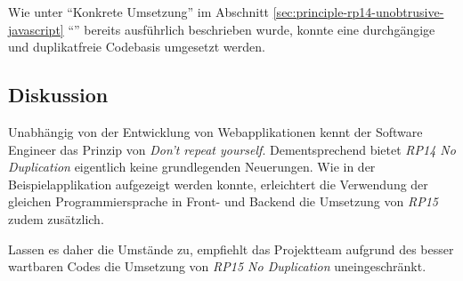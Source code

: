 Wie unter ``Konkrete Umsetzung'' im Abschnitt \ref{sec:principle-rp14-unobtrusive-javascript} ``'' bereits ausführlich beschrieben wurde, konnte eine durchgängige und duplikatfreie Codebasis umgesetzt werden.


\subsection*{Diskussion}

Unabhängig von der Entwicklung von Webapplikationen kennt der Software Engineer das Prinzip von \emph{Don't repeat yourself}. Dementsprechend bietet \emph{RP14 No Duplication} eigentlich keine grundlegenden Neuerungen. Wie in der Beispielapplikation aufgezeigt werden konnte, erleichtert die Verwendung der gleichen Programmiersprache in Front- und Backend die Umsetzung von \emph{RP15} zudem zusätzlich.

Lassen es daher die Umstände zu, empfiehlt das Projektteam aufgrund des besser wartbaren Codes die Umsetzung von \emph{RP15 No Duplication} uneingeschränkt.